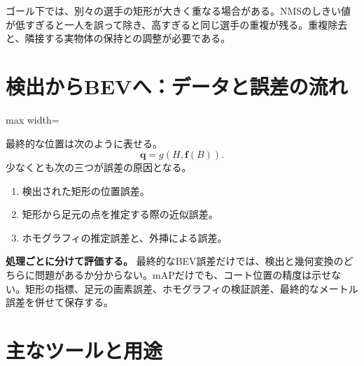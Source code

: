 \documentclass[11pt,a4paper,oneside]{report}
\begin{document}
\begin{riskBox}
ゴール下では、別々の選手の矩形が大きく重なる場合がある。NMSのしきい値が低すぎると一人を誤って除き、高すぎると同じ選手の重複が残る。重複除去と、隣接する実物体の保持との調整が必要である。
\end{riskBox}

\section{検出からBEVへ：データと誤差の流れ}

\begin{center}
\begin{adjustbox}{max width=\linewidth}
\end{adjustbox}
\end{center}

最終的な位置は次のように表せる。
\[
\mathbf q=g(H,\mathbf f(B)).
\]
少なくとも次の三つが誤差の原因となる。

\begin{enumerate}
  \item 検出された矩形の位置誤差。
  \item 矩形から足元の点を推定する際の近似誤差。
  \item ホモグラフィの推定誤差と、外挿による誤差。
\end{enumerate}

\begin{plainBox}
\textbf{処理ごとに分けて評価する。}\quad
最終的なBEV誤差だけでは、検出と幾何変換のどちらに問題があるか分からない。mAPだけでも、コート位置の精度は示せない。矩形の指標、足元の画素誤差、ホモグラフィの検証誤差、最終的なメートル誤差を併せて保存する。
\end{plainBox}

\section{主なツールと用途}
\end{document}
